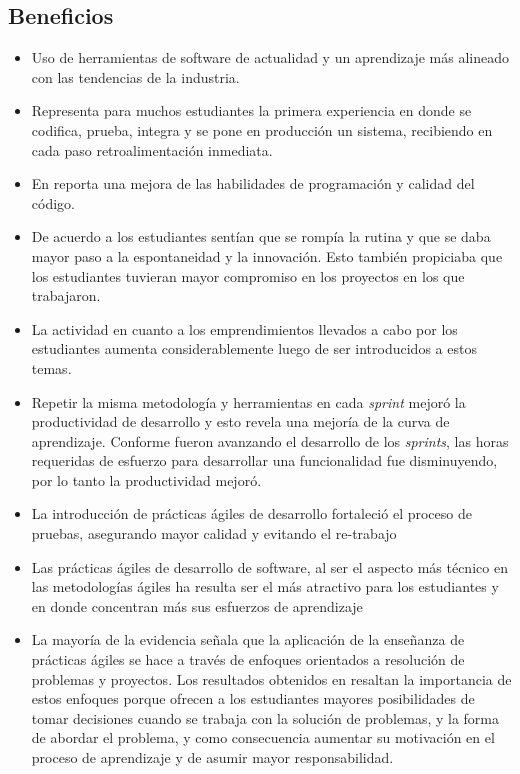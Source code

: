 \documentclass[journal]{IEEEtran}
\begin{document}
\subsection{Beneficios}
\begin{itemize}
    \item Uso de herramientas de software de actualidad y un aprendizaje más alineado con las tendencias de la industria\cite{cenfotec-2}.
    \item Representa para muchos estudiantes la primera experiencia en donde se codifica, prueba, integra y se pone en producción un sistema, recibiendo en cada paso retroalimentación inmediata\cite{kropp-meier-2}.
    \item En \cite{kropp-meier-1} reporta una mejora de las habilidades de programación y calidad del código.
    \item De acuerdo a \cite{scharlau} los estudiantes sentían que se rompía la rutina y que se daba mayor paso a la espontaneidad y la innovación. Esto también propiciaba que los estudiantes tuvieran mayor compromiso en los proyectos en los que trabajaron.
    \item La actividad en cuanto a los emprendimientos llevados a cabo por los estudiantes aumenta considerablemente luego de ser introducidos a estos temas\cite{hickey-salas}.
    \item Repetir la misma metodología y herramientas en cada \emph{sprint} mejoró la productividad de desarrollo y esto revela una mejoría de la curva de aprendizaje. Conforme fueron avanzando el desarrollo de los \emph{sprints}, las horas requeridas de esfuerzo para desarrollar una funcionalidad fue disminuyendo, por lo tanto la productividad mejoró\cite{salazar}.
    \item La introducción de prácticas ágiles de desarrollo fortaleció el proceso de pruebas, asegurando mayor calidad y evitando el re-trabajo\cite{salazar}
    \item Las prácticas ágiles de desarrollo de software, al ser el aspecto más técnico en las metodologías ágiles ha resulta ser el más atractivo para los estudiantes y en donde concentran más sus esfuerzos de aprendizaje\cite{steghoger-et-al}
    \item La mayoría de la evidencia señala que la aplicación de la enseñanza de prácticas ágiles se hace a través de enfoques orientados a resolución de problemas y proyectos. Los resultados obtenidos en \cite{mora-et-al-1} resaltan la importancia de estos enfoques porque ofrecen a los estudiantes mayores posibilidades de tomar decisiones cuando se trabaja con la solución de problemas, y la forma de abordar el problema, y como consecuencia aumentar su motivación en el proceso de aprendizaje y de asumir mayor responsabilidad.

\end{itemize}
\end{document}
